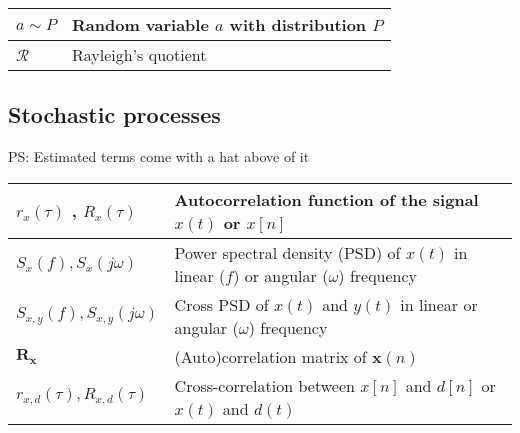 \begin{xltabular}{\textwidth}{XX}
	\(a\sim P\)                                                                                                                                  & Random variable \(a\) with distribution \(P\)                                                                                                                           \\ \hline
	\(\mathcal{R}\)                                                                                                                              & Rayleigh's quotient
\end{xltabular}
\subsection{Stochastic processes}
PS: Estimated terms come with a hat above of it
\begin{xltabular}{\textwidth}{XX}
	\(r_x(\tau)\) \cite{nossekAdaptiveArraySignal2015}, \(R_x(\tau)\)                                                                                                      & Autocorrelation function of the signal \(x(t)\) or \(x[n]\)                                                                                                                                   \\ \hline
	\(S_x(f), S_x(j\omega)\)                                                                                                      & Power spectral density (PSD) of \(x(t)\) in linear (\(f\)) or angular (\(\omega\)) frequency                                                                                                                                       \\ \hline
	\(S_{x,y}(f), S_{x,y}(j\omega)\)                                                                                              & Cross PSD of \(x(t)\) and \(y(t)\) in linear or angular (\(\omega\)) frequency                                                                                                                                                     \\ \hline
	\(\mathbf{R}_\mathbf{x}\)                                                                                                     & (Auto)correlation matrix of \(\mathbf{x}(n)\)                                                                                                                                                                                      \\ \hline
	\(r_{x,d}(\tau), R_{x,d}(\tau)\)                                                                                              & Cross-correlation between \(x[n]\) and \(d[n]\) or \(x(t)\) and \(d(t)\) \cite{nossekAdaptiveArraySignal2015}                                                                                                                      \\ \hline

\end{xltabular}
